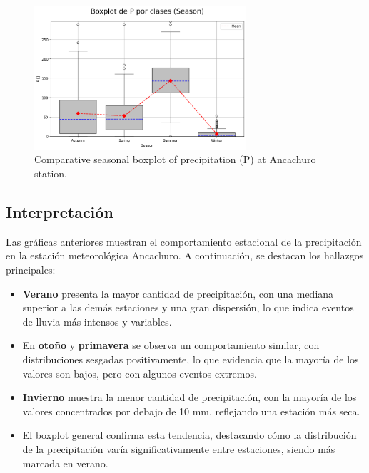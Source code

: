 \vspace{0.2cm}

\begin{figure}[htbp]
\centering
\includegraphics[width=0.7\textwidth]{resultados/por_estacion_del_anio/boxplot_clases_por_estacion/Ancachuro/P_ClassBoxplot_Season.png}
\caption{Comparative seasonal boxplot of precipitation (P) at Ancachuro station.}
\label{fig:ancachuro_p_box}
\end{figure}

\subsection*{Interpretación}

Las gráficas anteriores muestran el comportamiento estacional de la precipitación en la estación meteorológica Ancachuro. A continuación, se destacan los hallazgos principales:

\begin{itemize}
    \item \textbf{Verano} presenta la mayor cantidad de precipitación, con una mediana superior a las demás estaciones y una gran dispersión, lo que indica eventos de lluvia más intensos y variables.
    \item En \textbf{otoño} y \textbf{primavera} se observa un comportamiento similar, con distribuciones sesgadas positivamente, lo que evidencia que la mayoría de los valores son bajos, pero con algunos eventos extremos.
    \item \textbf{Invierno} muestra la menor cantidad de precipitación, con la mayoría de los valores concentrados por debajo de 10 mm, reflejando una estación más seca.
    \item El boxplot general confirma esta tendencia, destacando cómo la distribución de la precipitación varía significativamente entre estaciones, siendo más marcada en verano.
\end{itemize}



